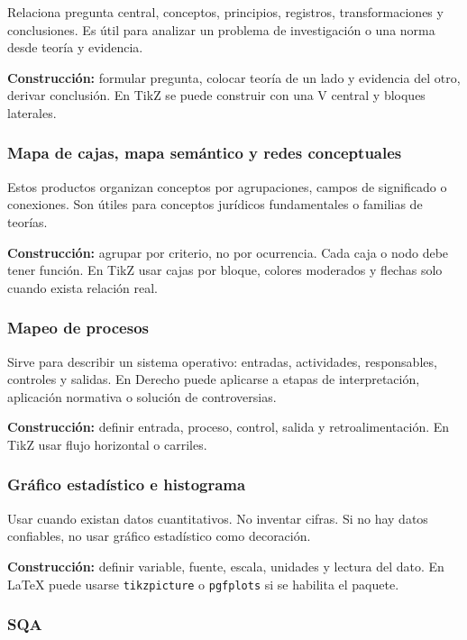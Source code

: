 Relaciona pregunta central, conceptos, principios, registros, transformaciones y conclusiones. Es útil para analizar un problema de investigación o una norma desde teoría y evidencia.

\textbf{Construcción:} formular pregunta, colocar teoría de un lado y evidencia del otro, derivar conclusión. En TikZ se puede construir con una V central y bloques laterales.

\subsubsection*{Mapa de cajas, mapa semántico y redes conceptuales}

Estos productos organizan conceptos por agrupaciones, campos de significado o conexiones. Son útiles para conceptos jurídicos fundamentales o familias de teorías.

\textbf{Construcción:} agrupar por criterio, no por ocurrencia. Cada caja o nodo debe tener función. En TikZ usar cajas por bloque, colores moderados y flechas solo cuando exista relación real.

\subsubsection*{Mapeo de procesos}

Sirve para describir un sistema operativo: entradas, actividades, responsables, controles y salidas. En Derecho puede aplicarse a etapas de interpretación, aplicación normativa o solución de controversias.

\textbf{Construcción:} definir entrada, proceso, control, salida y retroalimentación. En TikZ usar flujo horizontal o carriles.

\subsubsection*{Gráfico estadístico e histograma}

Usar cuando existan datos cuantitativos. No inventar cifras. Si no hay datos confiables, no usar gráfico estadístico como decoración.

\textbf{Construcción:} definir variable, fuente, escala, unidades y lectura del dato. En LaTeX puede usarse \texttt{tikzpicture} o \texttt{pgfplots} si se habilita el paquete.

\subsubsection*{SQA}

